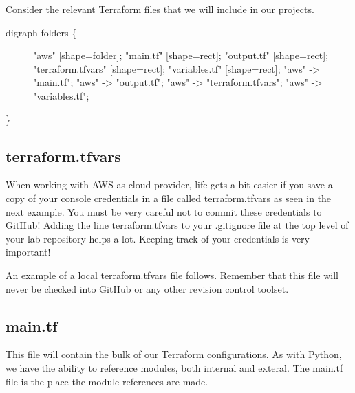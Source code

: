 \justify
Consider the relevant Terraform files that we will include in our
projects.

\begin{description}
   \item[digraph folders \{]
         "aws" {[}shape=folder{]}; "main.tf" {[}shape=rect{]}; "output.tf"
         {[}shape=rect{]}; "terraform.tfvars" {[}shape=rect{]}; "variables.tf"
         {[}shape=rect{]}; "aws" -\textgreater{} "main.tf"; "aws" -\textgreater{}
         "output.tf"; "aws" -\textgreater{} "terraform.tfvars"; "aws"
         -\textgreater{} "variables.tf";
\end{description}

\}


\subsection{terraform.tfvars}

When working with AWS as cloud provider, life gets a bit easier if you
save a copy of your console credentials in a file called
terraform.tfvars as seen in the next example. You must be very careful
not to commit these credentials to GitHub! Adding the line
terraform.tfvars to your .gitignore file at the top level of your lab
repository helps a lot. Keeping track of your credentials is very
important!

\justify
An example of a local terraform.tfvars file follows. Remember that this
file will never be checked into GitHub or any other revision control
toolset.

\begin{Shaded}
   \begin{Highlighting}[]
   \end{Highlighting}
\end{Shaded}


\subsection{main.tf}

\justify
This file will contain the bulk of our Terraform configurations. As with
Python, we have the ability to reference modules, both internal and
exteral. The main.tf file is the place the module references are made.

